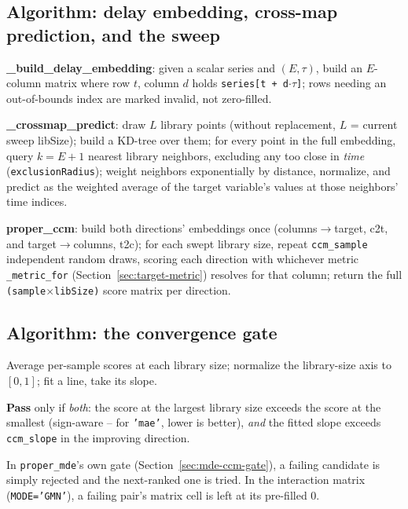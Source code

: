 \documentclass[11pt]{article}
\begin{document}
\subsection{Algorithm: delay embedding, cross-map prediction, and the sweep}
\begin{steps}
\item \textbf{\_build\_delay\_embedding}: given a scalar series and $(E,\tau)$, build an $E$-column matrix where row $t$, column $d$ holds \texttt{series[t + d}$\cdot\tau$\texttt{]}; rows needing an out-of-bounds index are marked invalid, not zero-filled.
\item \textbf{\_crossmap\_predict}: draw $L$ library points (without replacement, $L$ = current sweep libSize); build a KD-tree over them; for every point in the full embedding, query $k{=}E{+}1$ nearest library neighbors, excluding any too close in \emph{time} (\texttt{exclusionRadius}); weight neighbors exponentially by distance, normalize, and predict as the weighted average of the target variable's values at those neighbors' time indices.
\item \textbf{proper\_ccm}: build both directions' embeddings once (columns$\to$target, c2t, and target$\to$columns, t2c); for each swept library size, repeat \texttt{ccm\_sample} independent random draws, scoring each direction with whichever metric \texttt{\_metric\_for} (Section~\ref{sec:target-metric}) resolves for that column; return the full \texttt{(sample}$\times$\texttt{libSize)} score matrix per direction.
\end{steps}

\subsection{Algorithm: the convergence gate}
\label{sec:convergence-gate}
\begin{steps}
\item Average per-sample scores at each library size; normalize the library-size axis to $[0,1]$; fit a line, take its slope.
\item \textbf{Pass} only if \emph{both}: the score at the largest library size exceeds the score at the smallest (sign-aware -- for \texttt{'mae'}, lower is better), \emph{and} the fitted slope exceeds \texttt{ccm\_slope} in the improving direction.
\item In \texttt{proper\_mde}'s own gate (Section~\ref{sec:mde-ccm-gate}), a failing candidate is simply rejected and the next-ranked one is tried. In the interaction matrix (\texttt{MODE='GMN'}), a failing pair's matrix cell is left at its pre-filled 0.
\end{steps}
\end{document}
